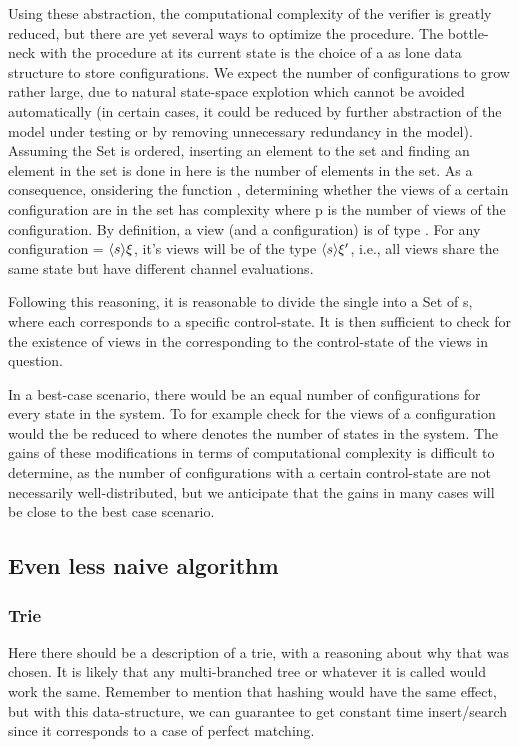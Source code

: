 Using these abstraction, the computational complexity of the verifier is greatly reduced, but there are yet several ways to optimize the procedure. The bottle-neck with the procedure at its current state is the choice of a  as lone data structure to store configurations. We expect the number of configurations to grow rather large, due to natural state-space explotion which cannot be avoided automatically (in certain cases, it could be reduced by further abstraction of the model under testing or by removing unnecessary redundancy in the model). Assuming the Set is ordered, inserting an element to the set and finding an element in the set is done in  here  is the number of elements in the set. As a consequence, onsidering the function , determining whether the views of a certain configuration are in the set has complexity  where p is the number of views of the configuration. By definition, a view (and a configuration) is of type . For any configuration  = $\langle s\rangle{\xi}$, it's views will be of the type $\langle s\rangle{\xi'}$, i.e., all views share the same state but have different channel evaluations.

Following this reasoning, it is reasonable to divide the single  into a Set of s, where each  corresponds to a specific control-state. It is then sufficient to check for the existence of views in the  corresponding to the control-state of the views in question.

In a best-case scenario, there would be an equal number of configurations for every state in the system. To for example check for the views of a configuration would the be reduced to  where  denotes the number of states in the system. The gains of these modifications in terms of computational complexity is difficult to determine, as the number of configurations with a certain control-state are not necessarily well-distributed, but we anticipate that the gains in many cases will be close to the best case scenario.



\subsection{Even less naive algorithm}
\subsubsection{Trie}
 Here there should be a description of a trie, with a reasoning about why that was chosen. It is likely that any multi-branched tree or whatever it is called would work the same. Remember to mention that hashing would have the same effect, but with this data-structure, we can guarantee to get constant time insert/search since it corresponds to a case of perfect matching.


